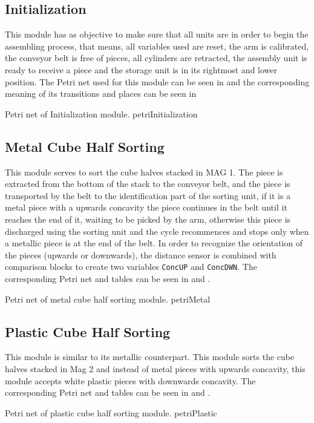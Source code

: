 \subsection{Initialization}
This module has as objective to make sure that all units are in order to begin
the assembling process, that means, all variables used are reset, the arm is
calibrated, the conveyor belt is free of pieces, all cylinders are retracted,
the assembly unit is ready to receive a piece and the storage unit is in its
rightmost and lower position. The Petri net used for this module can be seen in
 and the corresponding meaning of its
transitions and places can be seen in 


{Petri net of Initialization module.}
{petriInitialization}
\subsection{Metal Cube Half Sorting}
This module serves to sort the cube halves stacked in MAG 1. The piece is
extracted from the bottom of the stack to the conveyor belt, and the piece is
transported by the belt to the identification part of the sorting unit, if it is a
metal piece with a upwards concavity the piece continues in the belt until it
reaches the end of it, waiting to be picked by the arm, otherwise this piece is
discharged using the sorting unit and the cycle recommences and stops only when
a metallic piece is at the end of the belt.
In order to recognize the orientation of the pieces (upwards or downwards), the
distance sensor is combined with comparison blocks to create two variables
\verb|ConcUP| and \verb|ConcDWN|.
The corresponding Petri net and tables can be seen in
 and .


{Petri net of metal cube half sorting module.}
{petriMetal}
\subsection{Plastic Cube Half Sorting}
This module is similar to its metallic counterpart. This module sorts the cube
halves stacked in Mag 2 and instead of metal pieces with upwards concavity, this
module accepts white plastic pieces with downwards concavity.
The corresponding Petri net and tables can be seen in
 and .


{Petri net of plastic cube half sorting module.}
{petriPlastic}

